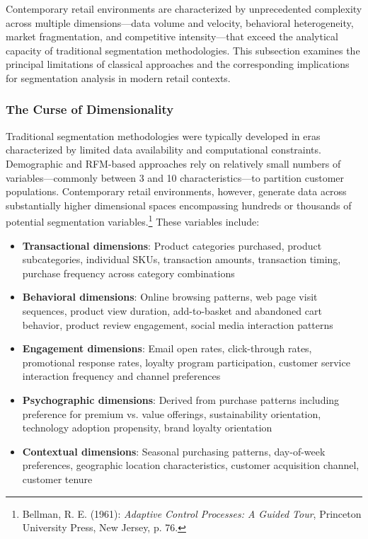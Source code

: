 \documentclass[12pt,a4paper,oneside]{report}
\begin{document}
Contemporary retail environments are characterized by unprecedented complexity across multiple dimensions—data volume and velocity, behavioral heterogeneity, market fragmentation, and competitive intensity—that exceed the analytical capacity of traditional segmentation methodologies. This subsection examines the principal limitations of classical approaches and the corresponding implications for segmentation analysis in modern retail contexts.

\subsubsection{The Curse of Dimensionality}

Traditional segmentation methodologies were typically developed in eras characterized by limited data availability and computational constraints. Demographic and RFM-based approaches rely on relatively small numbers of variables—commonly between 3 and 10 characteristics—to partition customer populations. Contemporary retail environments, however, generate data across substantially higher dimensional spaces encompassing hundreds or thousands of potential segmentation variables.\footnote{Bellman, R. E. (1961): \textit{Adaptive Control Processes: A Guided Tour}, Princeton University Press, New Jersey, p. 76.} These variables include:

\begin{itemize}
  \item \textbf{Transactional dimensions}: Product categories purchased, product subcategories, individual SKUs, transaction amounts, transaction timing, purchase frequency across category combinations
  \item \textbf{Behavioral dimensions}: Online browsing patterns, web page visit sequences, product view duration, add-to-basket and abandoned cart behavior, product review engagement, social media interaction patterns
  \item \textbf{Engagement dimensions}: Email open rates, click-through rates, promotional response rates, loyalty program participation, customer service interaction frequency and channel preferences
  \item \textbf{Psychographic dimensions}: Derived from purchase patterns including preference for premium vs. value offerings, sustainability orientation, technology adoption propensity, brand loyalty orientation
  \item \textbf{Contextual dimensions}: Seasonal purchasing patterns, day-of-week preferences, geographic location characteristics, customer acquisition channel, customer tenure
\end{itemize}
\end{document}
